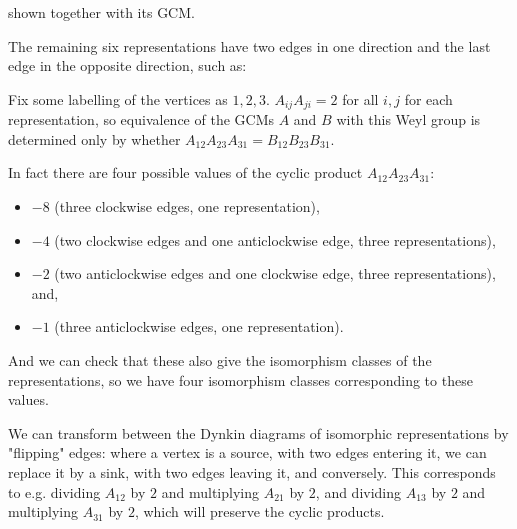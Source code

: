 \documentclass[11pt,a4paper]{report}
\theoremstyle{definition}
\begin{document}
shown together with its GCM. 

The remaining six representations have two edges in one direction and the last edge in the opposite direction, such as: 

\begin{figure}[h]
\centering
{}
\end{figure}


Fix some labelling of the vertices as $1,2,3$. $A_{ij} A_{ji} = 2$ for all $i, j$ for each representation, so equivalence of the GCMs $A$ and $B$ with this Weyl group is determined only by whether $A_{12} A_{23} A_{31} = B_{12} B_{23} B_{31}$. 

In fact there are four possible values of the cyclic product $A_{12} A_{23} A_{31}$: 

\begin{itemize}
\item $-8$ (three clockwise edges, one representation),
\item $-4$ (two clockwise edges and one anticlockwise edge, three representations),
\item $-2$ (two anticlockwise edges and one clockwise edge, three representations), and,
\item $-1$ (three anticlockwise edges, one representation). 
\end{itemize}

And we can check that these also give the isomorphism classes of the representations, so we have four isomorphism classes corresponding to these values. 

We can transform between the Dynkin diagrams of isomorphic representations by "flipping" edges: where a vertex is a source, with two edges entering it, we can replace it by a sink, with two edges leaving it, and conversely. This corresponds to e.g. dividing $A_{12}$ by $2$ and multiplying $A_{21}$ by $2$, and dividing $A_{13}$ by $2$ and multiplying $A_{31}$ by $2$, which will preserve the cyclic products. 
\end{document}
